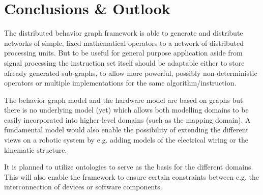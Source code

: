 \documentclass[a4paper,twocolumn]{esapub2005} %
\begin{document}
\section{Conclusions \& Outlook}
The distributed behavior graph framework is able to generate and distribute networks of simple, fixed mathematical operators to a network of distributed processing units.
But to be useful for general purpose application aside from signal processing the instruction set itself should be adaptable either to store already generated sub-graphs, to allow more powerful, possibly non-deterministic operators or multiple implementations for the same algorithm/instruction.

The behavior graph model and the hardware model are based on graphs but there is no underlying model (yet) which allows both modelling domains to be easily incorporated into higher-level domains (such as the mapping domain).
A fundamental model would also enable the possibility of extending the different views on a robotic system by e.g. adding models of the electrical wiring or the kinematic structure.

It is planned to utilize ontologies to serve as the basis for the different domains.
This will also enable the framework to ensure certain constraints between e.g. the interconnection of devices or software components.




\end{document}
